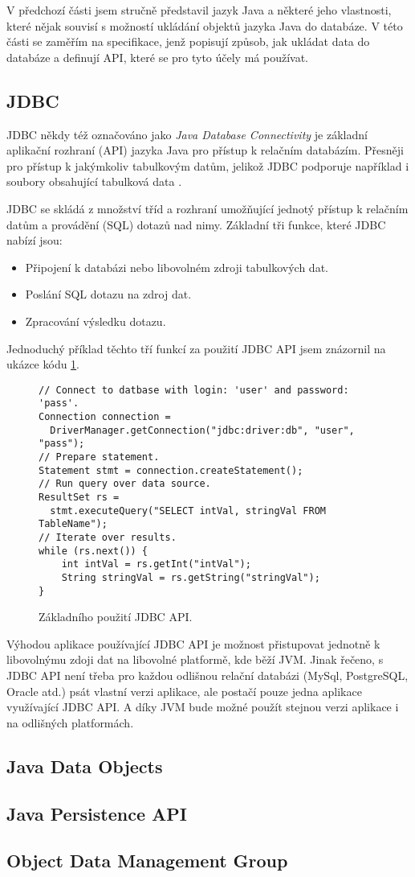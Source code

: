 V předchozí části jsem stručně představil jazyk Java a některé jeho vlastnosti, které nějak souvisí s možností ukládání objektů jazyka Java do databáze. V této části se zaměřím na specifikace, jenž popisují způsob, jak ukládat data do databáze a definují API, které se pro tyto účely má používat. 

\subsection{JDBC\texttrademark}
JDBC někdy též označováno jako \textit{Java Database Connectivity} je základní aplikační rozhraní (API) jazyka Java pro přístup k relačním databázím. Přesněji pro přístup k jakýmkoliv tabulkovým datům, jelikož JDBC podporuje například i soubory obsahující tabulková data \cite{fisher:jdbc,donahue:jdpb}.

JDBC se skládá z množství tříd a rozhraní umožňující jednotý přístup k relačním datům a provádění (SQL) dotazů nad nimy. Základní tři funkce, které JDBC nabízí jsou:
\begin{itemize}
  \item Připojení k databázi nebo libovolném zdroji tabulkových dat.
  \item Poslání SQL dotazu na zdroj dat.
  \item Zpracování výsledku dotazu.
\end{itemize}

Jednoduchý příklad těchto tří funkcí za použití JDBC API jsem znázornil na ukázce kódu \ref{jdbc:conn}.
\begin{figure}
\begin{lstlisting}
// Connect to datbase with login: 'user' and password: 'pass'.
Connection connection = 
  DriverManager.getConnection("jdbc:driver:db", "user", "pass");
// Prepare statement.
Statement stmt = connection.createStatement();
// Run query over data source.
ResultSet rs = 
  stmt.executeQuery("SELECT intVal, stringVal FROM TableName");
// Iterate over results.
while (rs.next()) {
    int intVal = rs.getInt("intVal");
    String stringVal = rs.getString("stringVal");
}
\end{lstlisting}
\caption{Základního použití JDBC API.}
\label{jdbc:conn}
\end{figure}


Výhodou aplikace používající JDBC API je možnost přistupovat jednotně k libovolnýmu zdoji dat na libovolné platformě, kde běží JVM. Jinak řečeno, s JDBC API není třeba pro každou odlišnou relační databázi (MySql, PostgreSQL, Oracle atd.) psát vlastní verzi aplikace, ale postačí pouze jedna aplikace využívající JDBC API. A díky JVM bude možné použít stejnou verzi aplikace i na odlišných platformách.
\subsection{Java Data Objects}
\cite{jordan:jdo,roos:jdo,tyagi:cjdo,ezzio:uujdo}
\subsection{Java Persistence API}
\cite{jpa:spec}
\subsection{Object Data Management Group}
\cite{odmg}
